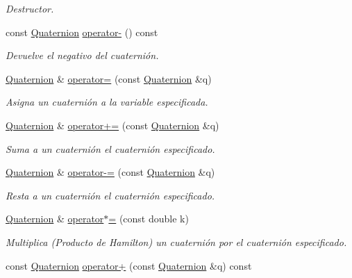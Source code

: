 \begin{DoxyCompactItemize}
\begin{DoxyCompactList}\small\item\em \-Destructor. \end{DoxyCompactList}\item 
const \hyperlink{classdfv_1_1Quaternion}{\-Quaternion} \hyperlink{classdfv_1_1Quaternion_aa1cefcee3c9810a16520be2dbd0d830f}{operator-\/} () const 
\begin{DoxyCompactList}\small\item\em \-Devuelve el negativo del cuaternión. \end{DoxyCompactList}\item 
\hyperlink{classdfv_1_1Quaternion}{\-Quaternion} \& \hyperlink{classdfv_1_1Quaternion_a6301cfa00246664d767765fb692fb0e0}{operator=} (const \hyperlink{classdfv_1_1Quaternion}{\-Quaternion} \&q)
\begin{DoxyCompactList}\small\item\em \-Asigna un cuaternión a la variable especificada. \end{DoxyCompactList}\item 
\hyperlink{classdfv_1_1Quaternion}{\-Quaternion} \& \hyperlink{classdfv_1_1Quaternion_a5b9939d9065cba305b8983c1475a8b8f}{operator+=} (const \hyperlink{classdfv_1_1Quaternion}{\-Quaternion} \&q)
\begin{DoxyCompactList}\small\item\em \-Suma a un cuaternión el cuaternión especificado. \end{DoxyCompactList}\item 
\hyperlink{classdfv_1_1Quaternion}{\-Quaternion} \& \hyperlink{classdfv_1_1Quaternion_a3fdafbcff5c33582758e88fbb5458e6e}{operator-\/=} (const \hyperlink{classdfv_1_1Quaternion}{\-Quaternion} \&q)
\begin{DoxyCompactList}\small\item\em \-Resta a un cuaternión el cuaternión especificado. \end{DoxyCompactList}\item 
\hyperlink{classdfv_1_1Quaternion}{\-Quaternion} \& \hyperlink{classdfv_1_1Quaternion_afad0b332ff75a339b107ce9ba208080a}{operator$\ast$=} (const double k)
\begin{DoxyCompactList}\small\item\em \-Multiplica (\-Producto de \-Hamilton) un cuaternión por el cuaternión especificado. \end{DoxyCompactList}\item 
const \hyperlink{classdfv_1_1Quaternion}{\-Quaternion} \hyperlink{classdfv_1_1Quaternion_a031f9658c9901eca10aaa6d5904b9c20}{operator+} (const \hyperlink{classdfv_1_1Quaternion}{\-Quaternion} \&q) const 

\end{DoxyCompactItemize}
